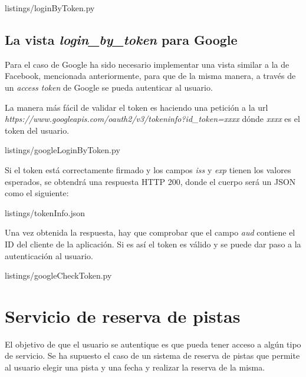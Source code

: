 
{listings/loginByToken.py} %

\subsection{La vista \textit{login\_by\_token} para Google}

Para el caso de Google ha sido necesario implementar una vista similar a la de Facebook, mencionada anteriormente, para que de la misma manera, a través de un \textit{access token} de Google se pueda autenticar al usuario. 
\newline

La manera más fácil de validar el token es haciendo una petición a la url \textit{https://www.googleapis.com/oauth2/v3/tokeninfo?id\_token=xxxx} dónde \textit{xxxx} es el token del usuario.
\newline

{listings/googleLoginByToken.py} %

Si el token está correctamente firmado y los campos \textit{iss} y \textit{exp} tienen los valores esperados, se obtendrá una respuesta HTTP 200, donde el cuerpo será un JSON como el siguiente: 


{listings/tokenInfo.json} %

Una vez obtenida la respuesta, hay que comprobar que el campo \textit{aud} contiene el ID del cliente de la aplicación. Si es así el token es válido y se puede dar paso a la autenticación al usuario.
\newline


{listings/googleCheckToken.py} %

\section{Servicio de reserva de pistas}

El objetivo de que el usuario se autentique es que pueda tener acceso a algún tipo de servicio. Se ha supuesto el caso de un sistema de reserva de pistas que permite al usuario elegir una pista y una fecha y realizar la reserva de la misma.


